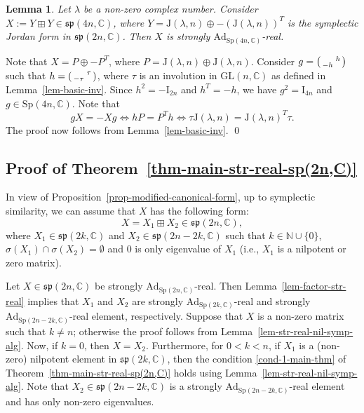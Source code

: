 \documentclass[11pt,reqno]{amsart}
\renewenvironment{proof}{{\bfseries Proof.}}{\qed}
\numberwithin{equation}{section}
\newtheorem{lemma}[theorem]{Lemma}
\theoremstyle{definition}
\def\C{\mathbb C}
\def\N{\mathbb N}
\def\C{\mathbb {C}}
\def\N{\mathbb {N}}
\newcommand{\thmref}[1]{Theorem~\ref{#1}}
\newcommand{\lemref}[1]{Lemma~\ref{#1}}
\newcommand{\propref}[1]{Proposition~\ref{#1}}
\begin{document}
\begin{lemma}\label{lem-str-real-pair-non-nil} Let $\lambda$ be a non-zero complex number.  Consider $X :=Y \boxplus Y \in \mathfrak{sp}(4n,\mathbb{C}) $, where $Y= \mathrm{J}(\lambda, n) \oplus - (\mathrm{J}(\lambda, n))^{T}$ is the symplectic Jordan form in $\mathfrak{sp}(2n,\mathbb{C})$. Then $X$ is strongly $\mathrm{Ad}_{\mathrm{Sp}(4n,\mathbb{C})}$-real.
\end{lemma}
\begin{proof}
	Note that $X = P \oplus -P^{T}$, where $P = \mathrm{J}(\lambda, n) \oplus \mathrm{J}(\lambda, n)$. Consider $g = \begin{psmallmatrix}
		& h\\
		-	h	& 
	\end{psmallmatrix}$ such that $h= \begin{psmallmatrix}
		& \tau \\
		-	\tau 	& 
	\end{psmallmatrix}$,  where $\tau $ is an involution in $\mathrm{GL}(n,\C)$ as defined in \lemref{lem-basic-inv}. Since $h^2 = -\mathrm{I}_{2n}$ and $h^{T} =-h$, we have $g^2 = \mathrm{I}_{4n}$ and  $g \in \mathrm{Sp}(4n,\mathbb{C})$. Note that
	\begin{equation*}
		gX =-Xg  \Longleftrightarrow hP= P^{T}h  \Longleftrightarrow \tau \mathrm{J}(\lambda, n) = \mathrm{J}(\lambda, n)^{T} \tau.
	\end{equation*}
	The proof now follows from \lemref{lem-basic-inv}. 
\end{proof}


\subsection{Proof of \thmref{thm-main-str-real-sp(2n,C)}}  In view of \propref{prop-modified-canonical-form}, up to symplectic similarity, we can assume that $X$ has  the following form:
$$X = X_{1} \boxplus  X_{2} \in \mathfrak{sp}(2n,\mathbb{C}),$$ where $X_{1} \in \mathfrak{sp}(2k,\mathbb{C})$ and $X_{2} \in \mathfrak{sp}(2n-2k,\mathbb{C})$ such that $k \in \N \cup \{0\}$,  $\sigma( X_{1}) \cap \sigma( X_{2}) =  \emptyset$ and  $0$ is only  eigenvalue of $X_{1}$ (i.e., $X_1$ is a nilpotent or zero matrix).  


 Let $X \in \mathfrak{sp}(2n,\mathbb{C})$  be strongly $\mathrm{Ad}_{\mathrm{Sp}(2n,\mathbb{C})}$-real. Then \lemref{lem-factor-str-real} implies that $X_{1}$ and $ X_{2}$ are strongly $\mathrm{Ad}_{\mathrm{Sp}(2k,\mathbb{C})}$-real and  strongly $\mathrm{Ad}_{\mathrm{Sp}(2n-2k,\mathbb{C})}$-real element, respectively. Suppose that $X$ is a non-zero matrix such that $k \neq n$; otherwise the proof follows from   \lemref{lem-str-real-nil-symp-alg}. Now, if $k=0$, then $X =X_2$. Furthermore, for $0<k<n$, if $X_1$ is a (non-zero) nilpotent element in $\mathfrak{sp}(2k,\mathbb{C})$, then  the  condition \eqref{cond-1-main-thm}  of \thmref{thm-main-str-real-sp(2n,C)} holds using  \lemref{lem-str-real-nil-symp-alg}. Note that $X_2 \in \mathfrak{sp}(2n-2k,\mathbb{C})$ is a strongly $\mathrm{Ad}_{\mathrm{Sp}(2n-2k,\mathbb{C})}$-real element and has only non-zero eigenvalues. 
\end{document}
